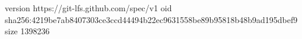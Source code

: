 version https://git-lfs.github.com/spec/v1
oid sha256:4219be7ab8407303ce3ccd44494b22ec9631558be89b95818b48b9ad195dbef9
size 1398236
